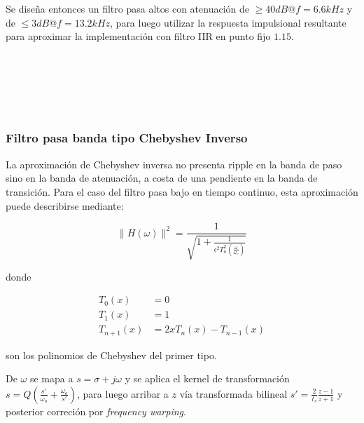 \documentclass[11pt, journal]{IEEEtran}
\begin{document}
Se diseña entonces un filtro pasa altos con atenuación de
\(\geq 40 dB @ f = 6.6 kHz\) y de \(\leq 3 dB @ f = 13.2 kHz\), para
luego utilizar la respuesta impulsional resultante para aproximar la
implementación con filtro IIR en punto fijo \(1.15\).


    \begin{center}
    \end{center}
    { \hspace*{\fill} \\}
    

    \begin{center}
    \end{center}
    { \hspace*{\fill} \\}
    

    \begin{center}
    \end{center}
    { \hspace*{\fill} \\}
    
    \subsubsection{Filtro pasa banda tipo Chebyshev Inverso}

La aproximación de Chebyshev inversa no presenta ripple en la banda de
paso sino en la banda de atenuación, a costa de una pendiente en la
banda de transición. Para el caso del filtro pasa bajo en tiempo
continuo, esta aproximación puede describirse mediante:

\[
\|H(\omega)\|^2 = \frac{1}{\sqrt{1 + \frac{1}{\epsilon^2 T^2_n(\frac{\omega}{\omega_c})}}}
\]

donde


\begin{align}
T_0(x) &= 0 \\
T_1(x) &= 1 \\
T_{n+1}(x) &= 2x T_n(x) - T_{n-1}(x)
\end{align}


son los polinomios de Chebyshev del primer tipo.

De \(\omega\) se mapa a \(s = \sigma + j\omega\) y se aplica el kernel
de transformación \(s = Q (\frac{s'}{\omega_o} + \frac{\omega_o}{s'})\),
para luego arribar a \(z\) vía transformada bilineal
\(s' = \frac{2}{t_s} \frac{z - 1}{z + 1}\) y posterior correción por
\emph{frequency warping}.
\end{document}
